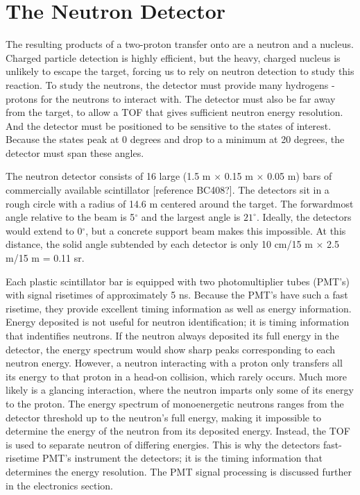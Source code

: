 \section{The Neutron Detector}

The resulting products of a two-proton transfer onto  are a neutron and a  nucleus.  Charged particle detection is highly efficient, but the heavy, charged  nucleus is unlikely to escape the target, forcing us to rely on neutron detection to study this reaction. To study the neutrons, the detector must provide many hydrogens - protons for the neutrons to interact with.  The detector must also be far away from the target, to allow a TOF that gives sufficient neutron energy resolution.  And the detector must be positioned to be sensitive to the \zp states of interest.  Because the \zp states peak at 0 degrees and drop to a minimum at 20 degrees, the detector must span these angles.

The neutron detector consists of 16 large (1.5 m $\times$ 0.15 m $\times$ 0.05 m) bars of commercially available scintillator [reference BC408?].  The detectors sit in a rough circle with a radius of 14.6 m centered around the target.  The forwardmost angle relative to the beam is 5$^{\circ}$ and the largest angle is $21^{\circ}$.  Ideally, the detectors would extend to 0$^{\circ}$, but a concrete support beam makes this impossible.  At this distance, the solid angle subtended by each detector is only 10 cm/15 m $\times$ 2.5 m/15 m = 0.11 sr.


Each plastic scintillator bar is equipped with two photomultiplier tubes (PMT's) with signal risetimes of approximately 5 ns.  Because the PMT's have such a fast risetime, they provide excellent timing information as well as energy information.  Energy deposited is not useful for neutron identification; it is timing information that indentifies neutrons.  If the neutron always deposited its full energy in the detector, the energy spectrum would show sharp peaks corresponding to each neutron energy.  However, a neutron interacting with a proton only transfers all its energy to that proton in a head-on collision, which rarely occurs.  Much more likely is a glancing interaction, where the neutron imparts only some of its energy to the proton.  The energy spectrum of monoenergetic neutrons ranges from the detector threshold up to the neutron's full energy, making it impossible to determine the energy of the neutron from its deposited energy.  Instead, the TOF is used to separate neutron of differing energies.  This is why the detectors fast-risetime PMT's instrument the detectors; it is the timing information that determines the energy resolution.  The PMT signal processing is discussed further in the electronics section.

